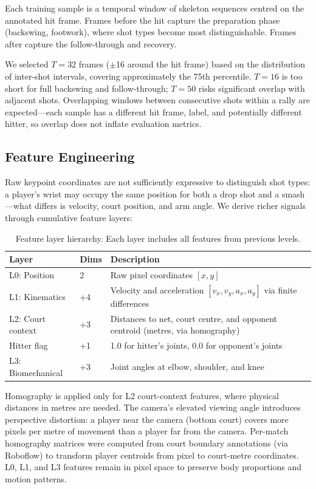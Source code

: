 \documentclass[11pt,a4paper]{article}
\begin{document}
Each training sample is a temporal window of skeleton sequences centred on the annotated hit frame. Frames before the hit capture the preparation phase (backswing, footwork), where shot types become most distinguishable. Frames after capture the follow-through and recovery.

We selected $T=32$ frames ($\pm$16 around the hit frame) based on the distribution of inter-shot intervals, covering approximately the 75th percentile. $T=16$ is too short for full backswing and follow-through; $T=50$ risks significant overlap with adjacent shots. Overlapping windows between consecutive shots within a rally are expected---each sample has a different hit frame, label, and potentially different hitter, so overlap does not inflate evaluation metrics.

\subsection{Feature Engineering}

Raw keypoint coordinates are not sufficiently expressive to distinguish shot types: a player's wrist may occupy the same position for both a drop shot and a smash---what differs is velocity, court position, and arm angle. We derive richer signals through cumulative feature layers:

\begin{table}[H]
\centering
\caption{Feature layer hierarchy. Each layer includes all features from previous levels.}
\label{tab:features}
\begin{tabular}{@{}llp{8cm}@{}}
\toprule
\textbf{Layer} & \textbf{Dims} & \textbf{Description} \\
\midrule
L0: Position & 2 & Raw pixel coordinates $[x, y]$ \\
L1: Kinematics & +4 & Velocity and acceleration $[v_x, v_y, a_x, a_y]$ via finite differences \\
L2: Court context & +3 & Distances to net, court centre, and opponent centroid (metres, via homography) \\
Hitter flag & +1 & 1.0 for hitter's joints, 0.0 for opponent's joints \\
L3: Biomechanical & +3 & Joint angles at elbow, shoulder, and knee \\
\bottomrule
\end{tabular}
\end{table}

Homography is applied only for L2 court-context features, where physical distances in metres are needed. The camera's elevated viewing angle introduces perspective distortion: a player near the camera (bottom court) covers more pixels per metre of movement than a player far from the camera. Per-match homography matrices were computed from court boundary annotations (via Roboflow) to transform player centroids from pixel to court-metre coordinates. L0, L1, and L3 features remain in pixel space to preserve body proportions and motion patterns.
\end{document}
